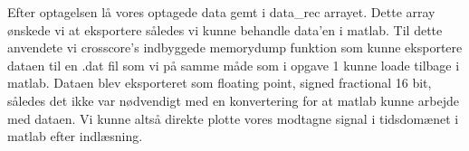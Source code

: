 Efter optagelsen lå vores optagede data gemt i data\_rec arrayet. Dette array ønskede vi at eksportere således vi kunne behandle data'en i matlab. Til dette anvendete vi crosscore's indbyggede memorydump funktion som kunne eksportere dataen til en .dat fil som vi på samme måde som i opgave 1 kunne loade tilbage i matlab. Dataen blev eksporteret som floating point, signed fractional 16 bit, således det ikke var nødvendigt med en konvertering for at matlab kunne arbejde med dataen. Vi kunne altså direkte plotte vores modtagne signal i tidsdomænet i matlab efter indlæsning. 




